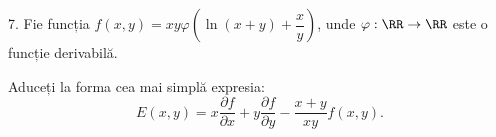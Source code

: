 \vspace{0.5cm}

7. Fie funcția $ f(x, y) = xy\varphi\left(\ln(x + y) + \dfrac{x}{y}\right) $,
unde $ \varphi : \RR \to \RR $ este o funcție derivabilă.

Aduceți la forma cea mai simplă expresia:
\[
  E(x, y) = x\dfrac{\partial f}{\partial x} + y \dfrac{\partial f}{\partial y} - %
  \dfrac{x + y}{xy} f(x, y).
\]


